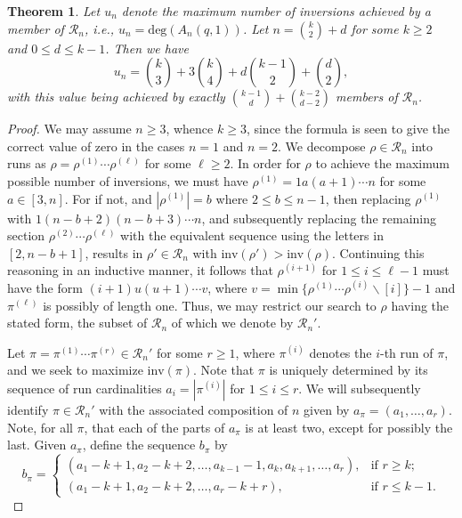 \documentclass[11pt,a4paper]{article}
\newtheorem{theorem}{Theorem}[section]
\begin{document}
\begin{theorem}\label{maxinv}
Let $u_n$ denote the maximum number of inversions achieved by a member of $\mathcal{R}_n$, i.e., $u_n=\text{deg}(A_n(q,1))$.  Let $n=\binom{k}{2}+d$ for some $k \geq 2$ and $0 \leq d \leq k-1$.  Then we have
\begin{equation}\label{maxinve1}
u_n=\binom{k}{3}+3\binom{k}{4}+d\binom{k-1}{2}+\binom{d}{2},
\end{equation}
with this value being achieved by exactly $\binom{k-1}{d}+\binom{k-2}{d-2}$ members of $\mathcal{R}_n$.
\end{theorem}
\begin{proof}
We may assume $n \geq 3$, whence $k \geq 3$, since the formula is seen to give the correct value of zero in the cases $n=1$ and $n=2$.  We decompose $\rho \in \mathcal{R}_n$ into runs as $\rho=\rho^{(1)}\cdots \rho^{(\ell)}$ for some $\ell \geq 2$.  In order for $\rho$ to achieve the maximum possible number of inversions, we must have $\rho^{(1)}=1a(a+1)\cdots n$ for some $a \in [3,n]$.  For if not, and $|\rho^{(1)}|=b$ where $2 \leq b \leq n-1$, then replacing $\rho^{(1)}$ with $1(n-b+2)(n-b+3)\cdots n$, and subsequently replacing the remaining section $\rho^{(2)}\cdots\rho^{(\ell)}$ with the equivalent sequence using the letters in $[2,n-b+1]$, results in $\rho' \in \mathcal{R}_n$ with $\text{inv}(\rho')>\text{inv}(\rho)$. Continuing this reasoning in an inductive manner, it follows that $\rho^{(i+1)}$ for $1 \leq i \leq \ell-1$ must have the form $(i+1)u(u+1)\cdots v$, where $v=\min\{\rho^{(1)}\cdots\rho^{(i)} \backslash [i]\}-1$ and $\pi^{(\ell)}$ is possibly of length one.  Thus, we may restrict our search to $\rho$ having the stated form, the subset of $\mathcal{R}_n$ of which we denote by $\mathcal{R}_n'$.

Let $\pi=\pi^{(1)}\cdots \pi^{(r)} \in \mathcal{R}_n'$ for some $r \geq 1$, where $\pi^{(i)}$ denotes the $i$-th run of $\pi$, and we seek to maximize $\text{inv}(\pi)$.  Note that $\pi$ is uniquely determined by its sequence of run cardinalities $a_i=|\pi^{(i)}|$ for $1 \leq i \leq r$.  We will subsequently identify $\pi \in \mathcal{R}_n'$ with the associated composition of $n$ given by $a_\pi=(a_1,\ldots,a_r)$.  Note, for all $\pi$, that each of the parts of $a_\pi$ is at least two, except for possibly the last. Given $a_\pi$, define the sequence $b_\pi$ by
\[
 b_\pi =
\begin{cases}
    (a_1-k+1,a_2-k+2,\ldots,a_{k-1}-1,a_k,a_{k+1},\ldots,a_r),   & \text{if } r \geq k; \\
    (a_1-k+1,a_2-k+2,\ldots,a_r-k+r),    & \text{if } r \leq k-1.
\end{cases}
\]


\end{proof}
\end{document}
